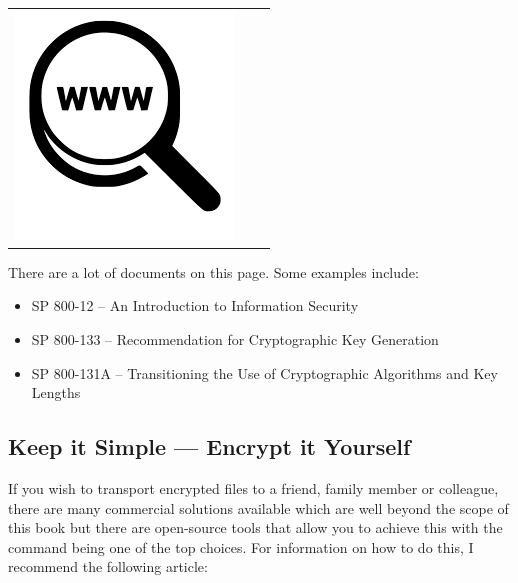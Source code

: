 \begin{table}[h]
\begin{tabular}{lcl}
\parbox[r]{0.5in}{ \includegraphics[scale=0.15]{figures/url.png}} & \parbox[l]{0.1in}{} & \parbox[l]{3in}{}
\end{tabular}
\end{table}

\noindent
There are a lot of documents on this page. Some examples include:

\begin{itemize}
	\item SP 800-12 -- An Introduction to Information Security
	\item SP 800-133 -- Recommendation for Cryptographic Key Generation
	\item SP 800-131A -- Transitioning the Use of Cryptographic Algorithms and Key Lengths
\end{itemize}

\subsection{Keep it Simple --- Encrypt it Yourself}

If you wish to transport encrypted files to a friend, family member or colleague, there are many commercial solutions available which are well beyond the scope of this book but there are open-source tools that allow you to achieve this with the  command being one of the top choices. For information on how to do this, I recommend the following article:

